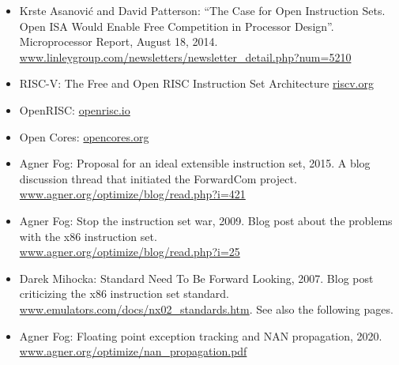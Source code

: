 \documentclass[forwardcom.tex]{subfiles}
\begin{document}
\begin{itemize}
\item
Krste Asanovi\'{c} and David Patterson: ``The Case for Open Instruction Sets. Open ISA Would Enable Free 
Competition in Processor Design''. Microprocessor Report, August 18, 2014. \\
\href{https://www.linleygroup.com/newsletters/newsletter_detail.php?num=5210}{www.linleygroup.com/newsletters/newsletter\_detail.php?num=5210}

\item
RISC-V: The Free and Open RISC Instruction Set Architecture
\href{https://riscv.org}{riscv.org}

\item
OpenRISC: 
\href{https://openrisc.io}{openrisc.io}

\item
Open Cores: 
\href{https://opencores.org}{opencores.org}

\item
Agner Fog: Proposal for an ideal extensible instruction set, 2015. A blog discussion thread that initiated the ForwardCom project. \\
\href{https://www.agner.org/optimize/blog/read.php?i=421}{www.agner.org/optimize/blog/read.php?i=421}

\item
Agner Fog: Stop the instruction set war, 2009. Blog post about the problems with the x86 instruction set. \\
\href{https://www.agner.org/optimize/blog/read.php?i=25}{www.agner.org/optimize/blog/read.php?i=25}

\item
Darek Mihocka: Standard Need To Be Forward Looking, 2007. Blog post criticizing the x86 instruction set standard. \\
\href{http://www.emulators.com/docs/nx02_standards.htm}{www.emulators.com/docs/nx02\_standards.htm}. See also the following pages.

\item
Agner Fog: Floating point exception tracking and NAN propagation, 2020. 
\href{https://www.agner.org/optimize/nan_propagation.pdf}{www.agner.org/optimize/nan\_propagation.pdf}


\end{itemize}
\end{document}
